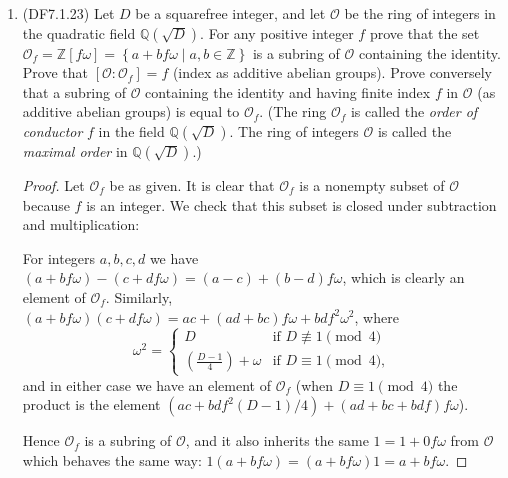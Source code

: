 \documentclass[11pt]{article}
\newcommand{\br}[1]{\left(#1\right)}
\newcommand{\cbr}[1]{\left\{#1\right\}}
\begin{document}
\begin{enumerate}
\begin{enumerate}[label=\textbf{(\alph*)}]
\begin{proof}
            Then for any subset $A$ of $X$, we have $A^2 = A\times A = A\cap A = A$, from which it follows that $\mathcal{P}(X)$ is a Boolean ring.
        \end{proof}
    \end{enumerate}
    \item (DF7.1.23) Let $D$ be a squarefree integer, and let $\mathcal{O}$ be the ring of integers in the quadratic field $\mathbb{Q}(\sqrt{D})$. For any positive integer $f$ prove that the set $\mathcal{O}_f = \mathbb{Z}[f\omega] = \cbr{a+bf\omega\mid a, b\in\mathbb{Z}}$ is a subring of $\mathcal{O}$ containing the identity. Prove that $[\mathcal{O}\colon\mathcal{O}_f] = f$ (index as additive abelian groups). Prove conversely that a subring of $\mathcal{O}$ containing the identity and having finite index $f$ in $\mathcal{O}$ (as additive abelian groups) is equal to $\mathcal{O}_f$. (The ring $\mathcal{O}_f$ is called the \textit{order of conductor} $f$ in the field $\mathbb{Q}(\sqrt{D})$. The ring of integers $\mathcal{O}$ is called the \textit{maximal order} in $\mathbb{Q}(\sqrt{D})$.)
    \begin{proof}
        Let $\mathcal{O}_f$ be as given. It is clear that $\mathcal{O}_f$ is a nonempty subset of $\mathcal{O}$ because $f$ is an integer. We check that this subset is closed under subtraction and multiplication:

        For integers $a,b,c,d$ we have $(a+bf\omega) - (c+df\omega) = (a-c) + (b-d)f\omega$, which is clearly an element of $\mathcal{O}_f$. Similarly, $(a+bf\omega)(c+df\omega) = ac + (ad+bc)f\omega + bdf^2\omega^2$, where \[\omega^2 = \begin{cases}
            D & \text{if $D\not\equiv 1 \pmod 4$}\\
            \br{\frac{D-1}{4}} + \omega & \text{if $D\equiv 1 \pmod 4$},
        \end{cases}\] and in either case we have an element of $\mathcal{O}_f$ (when $D\equiv 1 \pmod 4$ the product is the element $(ac + bdf^2(D-1)/4) + (ad+bc+bdf)f\omega $).

        Hence $\mathcal{O}_f$ is a subring of $\mathcal{O}$, and it also inherits the same $1 = 1 + 0f\omega$ from $\mathcal{O}$ which behaves the same way: $1(a+bf\omega) = (a+bf\omega)1 = a+bf\omega$.


\end{proof}
\end{enumerate}
\end{document}
